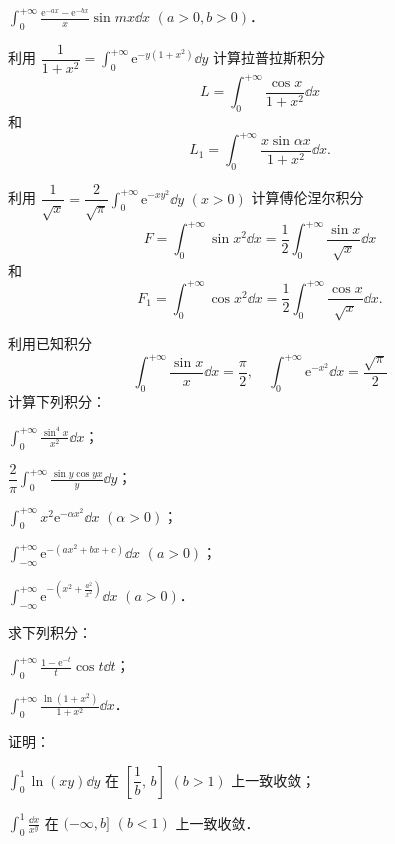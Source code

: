 \begin{xiti}
\begin{ziti}
\item $\displaystyle\int_{0}^{+\infty}\frac{\mathrm{e}^{-ax}-\mathrm{e}^{-bx}}{x}\sin mx\dd x$ $(a>0,b>0)$．
\end{ziti}
\item 利用 $\dfrac{1}{1+x^{2}}=\displaystyle\int_{0}^{+\infty}\mathrm{e}^{-y(1+x^{2})}\dd y$ 计算拉普拉斯积分
\[
L=\int_{0}^{+\infty}\frac{\cos x}{1+x^{2}}\dd x
\]
和
\[
L_{1}=\int_{0}^{+\infty}\frac{x\sin\alpha x}{1+x^{2}}\dd x.
\]
\item 利用 $\dfrac{1}{\sqrt{x}}=\dfrac{2}{\sqrt{\pi}}\displaystyle\int_{0}^{+\infty}\mathrm{e}^{-xy^{2}}\dd y$ $(x>0)$ 计算傅伦涅尔积分
\[
F=\int_{0}^{+\infty}\sin x^{2}\dd x=\frac{1}{2}\int_{0}^{+\infty}\frac{\sin x}{\sqrt{x}}\dd x
\]
和
\[
F_{1}=\int_{0}^{+\infty}\cos x^{2}\dd x=\frac{1}{2}\int_{0}^{+\infty}\frac{\cos x}{\sqrt{x}}\dd x.
\]
\item 利用已知积分
\[
\int_{0}^{+\infty}\frac{\sin x}{x}\dd x=\frac{\pi}{2},\quad\int_{0}^{+\infty}\mathrm{e}^{-x^{2}}\dd x=\frac{\sqrt{\pi}}{2}
\]
计算下列积分：
\begin{ziti}
\item $\displaystyle\int_{0}^{+\infty}\frac{\sin^{4}x}{x^{2}}\dd x$；
\item $\dfrac{2}{\pi}\displaystyle\int_{0}^{+\infty}\frac{\sin y\cos yx}{y}\dd y$；
\item $\displaystyle\int_{0}^{+\infty}x^{2}\mathrm{e}^{-\alpha x^{2}}\dd x$ $(\alpha>0)$；
\item $\displaystyle\int_{-\infty}^{+\infty}\mathrm{e}^{-(ax^{2}+bx+c)}\dd x$ $(a>0)$；
\item $\displaystyle\int_{-\infty}^{+\infty}\mathrm{e}^{-\left(x^{2}+\frac{a^{2}}{x^{2}}\right)}\dd x$ $(a>0)$．
\end{ziti}
\item 求下列积分：
\begin{ziti}
\item $\displaystyle\int_{0}^{+\infty}\frac{1-\mathrm{e}^{-t}}{t}\cos t\dd t$；
\item $\displaystyle\int_{0}^{+\infty}\frac{\ln(1+x^{2})}{1+x^{2}}\dd x$．
\end{ziti}
\item 证明：
\begin{ziti}
\item $\displaystyle\int_{0}^{1}\ln(xy)\dd y$ 在 $\left[\dfrac{1}{b},\,b\right]$ $(b>1)$ 上一致收敛；
\item $\displaystyle\int_{0}^{1}\frac{\dd x}{x^{y}}$ 在 $(-\infty,b]$ $(b<1)$ 上一致收敛．
\end{ziti}
\end{xiti}

